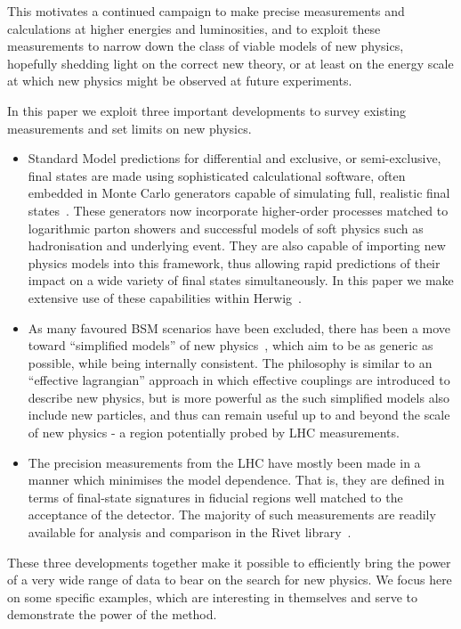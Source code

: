 \documentclass[floatfix]{article}
\begin{document}
This motivates a continued campaign to make precise measurements and calculations at higher energies and 
luminosities, and to exploit these measurements to narrow down the class of viable models of new physics, 
hopefully shedding light on the correct new theory, or at least on the energy scale at which
new physics might be observed at future experiments.

In this paper we exploit three important developments to survey existing measurements and set 
limits on new physics. 

\begin{itemize}
\item
Standard Model predictions for differential and exclusive, or semi-exclusive, 
final states are made using sophisticated calculational software, often embedded in Monte Carlo generators 
capable of simulating full, realistic final states~\cite{Buckley:2011ms}.
These generators now incorporate higher-order processes
matched to logarithmic parton showers and successful models of soft physics such as hadronisation and
underlying event. They are also capable of importing new physics models into this framework, thus allowing
rapid predictions of their impact on a wide variety of final states simultaneously. 
In this paper we make extensive use of these capabilities within Herwig~\cite{Bahr:2008pv}.
\item
As many favoured BSM scenarios have been excluded, there has been a move toward 
``simplified models'' of new physics~\cite{Alves:2011wf}, which aim to be as generic as possible, while being
internally consistent. The philosophy is similar to an ``effective lagrangian'' approach in which effective
couplings are introduced to describe new physics, but is more powerful as the such simplified models also
include new particles, and thus can remain useful up to and beyond the scale of new physics - a region 
potentially probed by LHC measurements.
\item
The precision measurements from the LHC have mostly been made in a manner which minimises the model 
dependence. That is, they are defined in terms of final-state signatures in fiducial regions well matched to the
acceptance of the detector. The majority of such measurements are readily available for analysis and
comparison in the Rivet library~\cite{Buckley:2010ar}. 
\end{itemize}

These three developments together make it possible to efficiently 
bring the power of a very wide range of data to bear on the search for new physics. We focus here on 
some specific examples, which are interesting in themselves and serve to demonstrate the power of the method.
\end{document}
